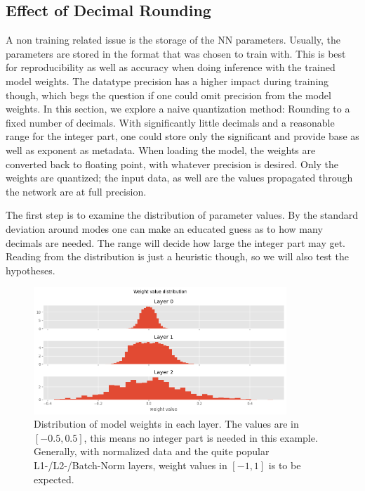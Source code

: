 \documentclass[11pt]{article}
\begin{document}
\subsection*{Effect of Decimal Rounding}

A non training related issue is the storage of the NN parameters. Usually, the
parameters are stored in the format that was chosen to train with. This is best
for reproducibility as well as accuracy when doing inference with the trained
model weights. The datatype precision has a higher impact during training
though, which begs the question if one could omit precision from the model
weights. In this section, we explore a naive quantization method: Rounding to a
fixed number of decimals. With significantly little decimals and a reasonable
range for the integer part, one could store only the significant and provide
base as well as exponent as metadata. When loading the model, the weights are
converted back to floating point, with whatever precision is desired. Only the
weights are quantized; the input data, as well are the values propagated
through the network are at full precision.

The first step is to examine the distribution of parameter values. By the
standard deviation around modes one can make an educated guess as to how many
decimals are needed. The range will decide how large the integer part may get.
Reading from the distribution is just a heuristic though, so we will also test
the hypotheses.

\begin{figure}[H]
	\centering
	\includegraphics[width=0.85\textwidth]{figures/118_dist.png}
	\caption{
		Distribution of model weights in each layer. The values are in $[-0.5, 0.5]$,
		this means no integer part is needed in this example. Generally, with normalized data
		and the quite popular L1-/L2-/Batch-Norm layers, weight values in $[-1, 1]$ is to be expected.}
\end{figure}
\end{document}
